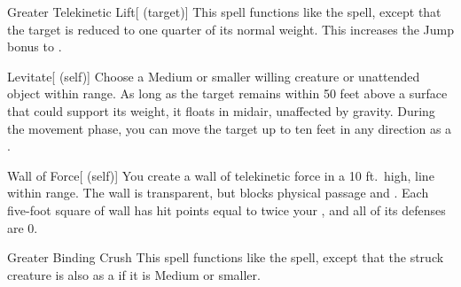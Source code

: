 \lowercase{\hypertarget{spell:Greater Telekinetic Lift}{}}\label{spell:Greater Telekinetic Lift}
\begin{attuneability}[\nth{3}]{\hypertarget{spell:Greater Telekinetic Lift}{Greater Telekinetic Lift}}[ (target)]
This spell functions like the  spell, except that the target is reduced to one quarter of its normal weight.
This increases the Jump bonus to .
\end{attuneability}
\vspace{0.25em}



\lowercase{\hypertarget{spell:Levitate}{}}\label{spell:Levitate}
\begin{attuneability}[\nth{4}]{\hypertarget{spell:Levitate}{Levitate}}[ (self)]
Choose a Medium or smaller willing creature or unattended object within \rngclose range.
As long as the target remains within 50 feet above a surface that could support its weight, it floats in midair, unaffected by gravity.
During the movement phase, you can move the target up to ten feet in any direction as a .
\end{attuneability}
\vspace{0.25em}



\lowercase{\hypertarget{spell:Wall of Force}{}}\label{spell:Wall of Force}
\begin{attuneability}[\nth{4}]{\hypertarget{spell:Wall of Force}{Wall of Force}}[ (self)]
You create a wall of telekinetic force in a 10 ft.\ high, \arealarge line within \rngmed range.
The wall is transparent, but blocks physical passage and .
Each five-foot square of wall has hit points equal to twice your , and all of its defenses are 0.
\end{attuneability}
\vspace{0.25em}



\lowercase{\hypertarget{spell:Greater Binding Crush}{}}\label{spell:Greater Binding Crush}
\begin{freeability}[\nth{6}]{\hypertarget{spell:Greater Binding Crush}{Greater Binding Crush}}
This spell functions like the  spell, except that the struck creature is also  as a  if it is Medium or smaller.
\end{freeability}
\vspace{0.25em}



